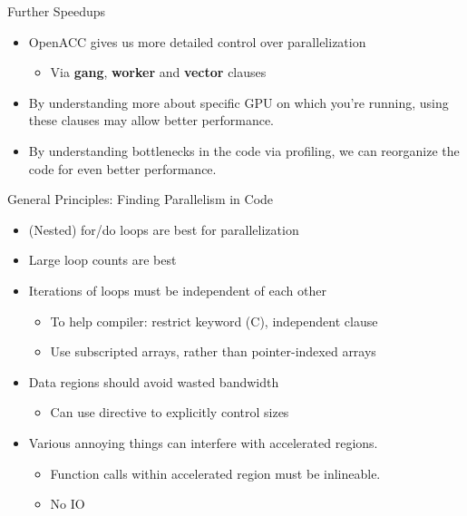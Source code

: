 \documentclass[10pt,t]{beamer}
\begin{document}
\begin{frame}{ Further Speedups}
  \begin{block}{}
    \begin{itemize}
      \item OpenACC gives us more detailed control over parallelization
      \begin{itemize}
        \item Via \textbf{gang}, \textbf{worker} and \textbf{vector} clauses
      \end{itemize}
      \item By understanding more about specific GPU on which you're running, using these clauses may allow better performance.
      \item By understanding bottlenecks in the code via profiling, we can reorganize the code for even better performance.
    \end{itemize}
  \end{block}
\end{frame}

\begin{frame}{ General Principles: Finding Parallelism in Code}
  \begin{itemize}
    \item (Nested) for/do loops are best for parallelization
    \item Large loop counts are best
    \item Iterations of loops must be independent of each other
    \begin{itemize}
      \item To help compiler: restrict keyword (C), independent clause
      \item Use subscripted arrays, rather than pointer-indexed arrays
    \end{itemize}
    \item Data regions should avoid wasted bandwidth
    \begin{itemize}
      \item Can use directive to explicitly control sizes
    \end{itemize}
    \item Various annoying things can interfere with accelerated regions.
    \begin{itemize}
      \item Function calls within accelerated region must be inlineable.
      \item No IO
    \end{itemize}
  \end{itemize}
\end{frame}
\end{document}
